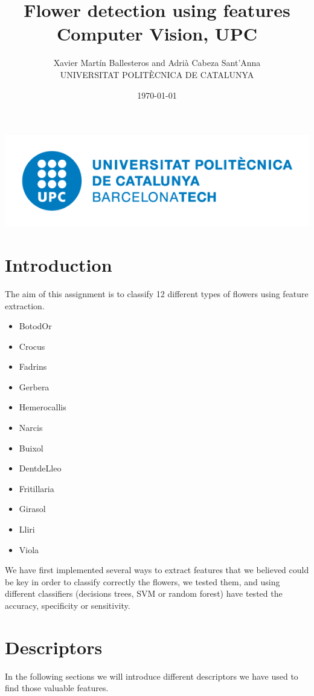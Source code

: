 \documentclass[11]{article}
\author{Xavier Martín Ballesteros and Adrià Cabeza Sant'Anna \\ \small UNIVERSITAT POLITÈCNICA DE CATALUNYA}
\title{Flower detection using features\\ \large{Computer Vision, UPC}}
\date{\today}
\begin{document}
\maketitle
\vspace*{\fill}
\begin{center}
\includegraphics[scale=0.4]{UPClogo.png}\par\vspace{1cm}
\end{center}
\newpage
\tableofcontents
\newpage 

\section{Introduction}
The aim of this assignment is to classify 12 different types of flowers using feature extraction. 
\begin{multicols}{3}
\begin{itemize}
\item BotodOr 
\item Crocus  
\item Fadrins   
\item Gerbera 
\item Hemerocallis 
\item Narcis
\item Buixol
\item DentdeLleo 
\item Fritillaria  
\item Girasol 
\item Lliri     
\item Viola

\end{itemize}
\end{multicols}

We have first implemented several ways to extract features that we believed could be key in order to classify correctly the flowers, we tested them, and using different classifiers (decisions trees, SVM or random forest) have tested the accuracy, specificity or sensitivity. 

\section{Descriptors}
In the following sections we will introduce different descriptors we have used to find those valuable features.
\end{document}
